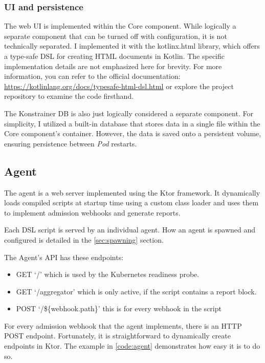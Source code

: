 \subsubsection{UI and persistence}

The web UI is implemented within the Core component. While logically a separate component that can be turned off with configuration, it is not technically separated. I implemented it with the kotlinx.html library, which offers a type-safe DSL for creating HTML documents in Kotlin. The specific implementation details are not emphasized here for brevity. For more information, you can refer to the official documentation: \url{https://kotlinlang.org/docs/typesafe-html-dsl.html} or explore the project repository to examine the code firsthand.

The Konstrainer DB is also just logically considered a separate component. For simplicity, I utilized a built-in database that stores data in a single file within the Core component's container. However, the data is saved onto a persistent volume, ensuring persistence between \emph{Pod} restarts.

\subsection{Agent}

The agent is a web server implemented using the Ktor framework. It dynamically loads compiled scripts at startup time using a custom class loader and uses them to implement admission webhooks and generate reports.

Each DSL script is served by an individual agent. How an agent is spawned and configured is detailed in the \ref{sec:spawning} section.

The Agent's API has these endpoints:

\begin{itemize}
    \item GET `/' which is used by the Kubernetes readiness probe.
    \item GET `/aggregator' which is only active, if the script contains a report block.
    \item POST `/\$\{webhook.path\}' this is for every webhook in the script
\end{itemize}

For every admission webhook that the agent implements, there is an HTTP POST endpoint. Fortunately, it is straightforward to dynamically create endpoints in Ktor. The example in \ref{code:agent} demonstrates how easy it is to do so.


